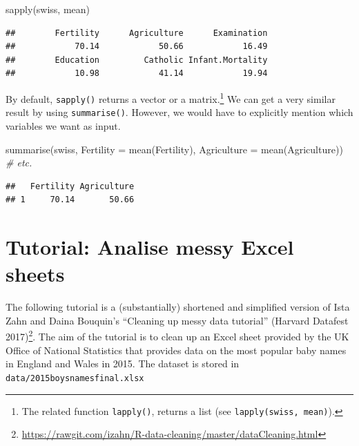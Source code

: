\documentclass[
  12pt,
]{style/krantz}
\newenvironment{Shaded}{\begin{snugshade}}{\end{snugshade}}
\newcommand{\AttributeTok}[1]{\textcolor[rgb]{0.77,0.63,0.00}{#1}}
\newcommand{\CommentTok}[1]{\textcolor[rgb]{0.56,0.35,0.01}{\textit{#1}}}
\newcommand{\FunctionTok}[1]{\textcolor[rgb]{0.00,0.00,0.00}{#1}}
\newcommand{\NormalTok}[1]{#1}
\renewcommand{\href}[2]{#2\footnote{\url{#1}}}
\begin{document}
\begin{Shaded}
\begin{Highlighting}[]
\FunctionTok{sapply}\NormalTok{(swiss, mean)}
\end{Highlighting}
\end{Shaded}

\begin{verbatim}
##        Fertility      Agriculture      Examination 
##            70.14            50.66            16.49 
##        Education         Catholic Infant.Mortality 
##            10.98            41.14            19.94
\end{verbatim}

By default, \texttt{sapply()} returns a vector or a matrix.\footnote{The related function \texttt{lapply()}, returns a list (see \texttt{lapply(swiss,\ mean)}).} We can get a very similar result by using \texttt{summarise()}. However, we would have to explicitly mention which variables we want as input.

\begin{Shaded}
\begin{Highlighting}[]
\FunctionTok{summarise}\NormalTok{(swiss, }
          \AttributeTok{Fertility =} \FunctionTok{mean}\NormalTok{(Fertility),}
          \AttributeTok{Agriculture =} \FunctionTok{mean}\NormalTok{(Agriculture)) }\CommentTok{\# etc.}
\end{Highlighting}
\end{Shaded}

\begin{verbatim}
##   Fertility Agriculture
## 1     70.14       50.66
\end{verbatim}

\hypertarget{tutorial-analise-messy-excel-sheets}{%
\section{Tutorial: Analise messy Excel sheets}\label{tutorial-analise-messy-excel-sheets}}

The following tutorial is a (substantially) shortened and simplified version of Ista Zahn and Daina Bouquin's \href{https://rawgit.com/izahn/R-data-cleaning/master/dataCleaning.html}{``Cleaning up messy data tutorial'' (Harvard Datafest 2017)}. The aim of the tutorial is to clean up an Excel sheet provided by the UK Office of National Statistics that provides data on the most popular baby names in England and Wales in 2015. The dataset is stored in \texttt{data/2015boysnamesfinal.xlsx}
\end{document}
